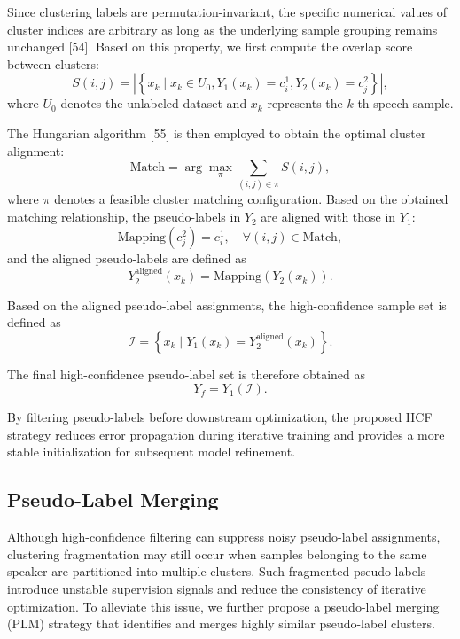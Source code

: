 \documentclass[lettersize,journal]{IEEEtran}
\begin{document}
Since clustering labels are permutation-invariant, the specific numerical values of cluster indices are arbitrary as long as the underlying sample grouping remains unchanged [54]. Based on this property, we first compute the overlap score between clusters:
\begin{equation}
S(i,j)
=
\left|
\left\{
x_k
\mid
x_k\in U_0,
Y_1(x_k)=c_i^1,
Y_2(x_k)=c_j^2
\right\}
\right|,
\end{equation}
where $U_0$ denotes the unlabeled dataset and $x_k$ represents the $k$-th speech sample.

The Hungarian algorithm [55] is then employed to obtain the optimal cluster alignment:
\begin{equation}
\mathrm{Match}
=
\arg\max_{\pi}
\sum_{(i,j)\in\pi}
S(i,j),
\end{equation}
where $\pi$ denotes a feasible cluster matching configuration. Based on the obtained matching relationship, the pseudo-labels in $Y_2$ are aligned with those in $Y_1$:
\begin{equation}
\mathrm{Mapping}(c_j^2)=c_i^1,
\quad
\forall(i,j)\in\mathrm{Match},
\end{equation}
and the aligned pseudo-labels are defined as
\begin{equation}
Y_2^{\mathrm{aligned}}(x_k)
=
\mathrm{Mapping}(Y_2(x_k)).
\end{equation}

Based on the aligned pseudo-label assignments, the high-confidence sample set is defined as
\begin{equation}
\mathcal{I}
=
\left\{
x_k
\mid
Y_1(x_k)
=
Y_2^{\mathrm{aligned}}(x_k)
\right\}.
\end{equation}

The final high-confidence pseudo-label set is therefore obtained as
\begin{equation}
Y_f
=
Y_1(\mathcal{I}).
\end{equation}

By filtering pseudo-labels before downstream optimization, the proposed HCF strategy reduces error propagation during iterative training and provides a more stable initialization for subsequent model refinement.

\subsection{Pseudo-Label Merging}

Although high-confidence filtering can suppress noisy pseudo-label assignments, clustering fragmentation may still occur when samples belonging to the same speaker are partitioned into multiple clusters. Such fragmented pseudo-labels introduce unstable supervision signals and reduce the consistency of iterative optimization. To alleviate this issue, we further propose a pseudo-label merging (PLM) strategy that identifies and merges highly similar pseudo-label clusters.
\end{document}
